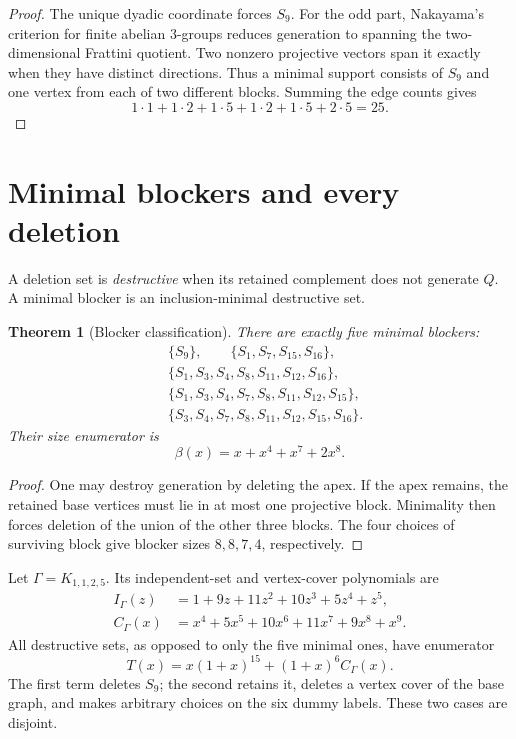 \documentclass[10pt]{article}
\newtheorem{theorem}{Theorem}
\begin{document}
\begin{proof}
The unique dyadic coordinate forces $S_9$.  For the odd part, Nakayama's
criterion for finite abelian $3$-groups reduces generation to spanning the
two-dimensional Frattini quotient.  Two nonzero projective vectors span it
exactly when they have distinct directions.  Thus a minimal support consists
of $S_9$ and one vertex from each of two different blocks.  Summing the edge
counts gives
\[
 1\cdot1+1\cdot2+1\cdot5+1\cdot2+1\cdot5+2\cdot5=25.
\]
\end{proof}

\section{Minimal blockers and every deletion}
A deletion set is \emph{destructive} when its retained complement does not
generate $Q$.  A minimal blocker is an inclusion-minimal destructive set.

\begin{theorem}[Blocker classification]\label{thm:blockers}
There are exactly five minimal blockers:
\[
\begin{split}
&\{S_9\},\qquad \{S_1,S_7,S_{15},S_{16}\},\\
&\{S_1,S_3,S_4,S_8,S_{11},S_{12},S_{16}\},\\
&\{S_1,S_3,S_4,S_7,S_8,S_{11},S_{12},S_{15}\},\\
&\{S_3,S_4,S_7,S_8,S_{11},S_{12},S_{15},S_{16}\}.
\end{split}
\]
Their size enumerator is
\[
 \beta(x)=x+x^4+x^7+2x^8.
\]
\end{theorem}

\begin{proof}
One may destroy generation by deleting the apex.  If the apex remains, the
retained base vertices must lie in at most one projective block.  Minimality
then forces deletion of the union of the other three blocks.  The four choices
of surviving block give blocker sizes $8,8,7,4$, respectively.
\end{proof}

Let $\Gamma=K_{1,1,2,5}$.  Its independent-set and vertex-cover polynomials
are
\begin{align*}
 I_\Gamma(z)&=1+9z+11z^2+10z^3+5z^4+z^5,\\
 C_\Gamma(x)&=x^4+5x^5+10x^6+11x^7+9x^8+x^9.
\end{align*}
All destructive sets, as opposed to only the five minimal ones, have
enumerator
\begin{equation}\label{eq:transversal}
 T(x)=x(1+x)^{15}+(1+x)^6C_\Gamma(x).
\end{equation}
The first term deletes $S_9$; the second retains it, deletes a vertex cover of
the base graph, and makes arbitrary choices on the six dummy labels.  These
two cases are disjoint.
\end{document}
